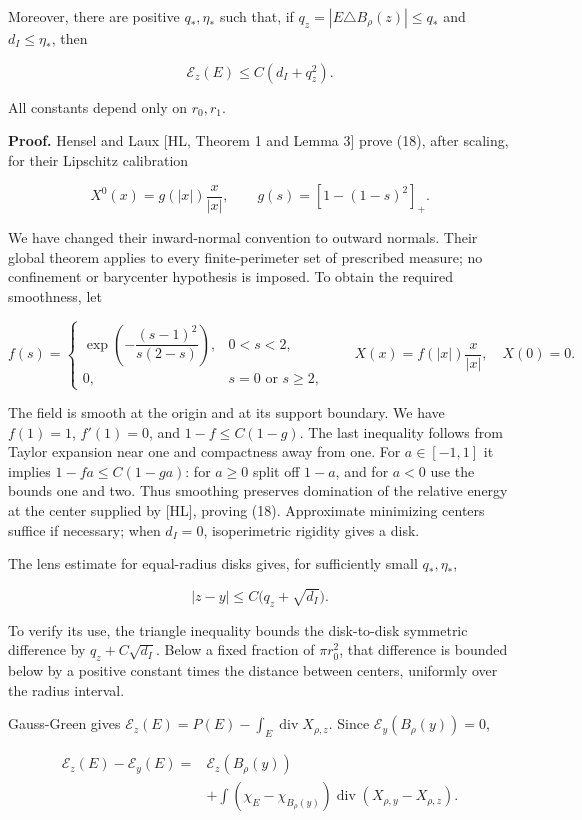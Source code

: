 \documentclass[11pt]{article}
\begin{document}
Moreover, there are positive \(q_*,\eta_*\) such that, if
\(q_z=|E\triangle B_\rho(z)|\le q_*\) and \(d_I\le\eta_*\), then

\[
\mathcal E_z(E)\le C(d_I+q_z^2).
\tag{19}
\]

All constants depend only on \(r_0,r_1\).

\textbf{Proof.} Hensel and Laux {[}HL, Theorem 1 and Lemma 3{]} prove
(18), after scaling, for their Lipschitz calibration

\[
X^0(x)=g(|x|)\frac{x}{|x|},\qquad g(s)=[1-(1-s)^2]_+.
\]

We have changed their inward-normal convention to outward normals. Their
global theorem applies to every finite-perimeter set of prescribed
measure; no confinement or barycenter hypothesis is imposed. To obtain
the required smoothness, let

\[
f(s)=\begin{cases}
\exp\!\left(-\dfrac{(s-1)^2}{s(2-s)}\right),&0<s<2,\\
0,&s=0\text{ or }s\ge2,
\end{cases}
\qquad X(x)=f(|x|)\frac{x}{|x|},\quad X(0)=0.
\tag{20}
\]

The field is smooth at the origin and at its support boundary. We have
\(f(1)=1\), \(f'(1)=0\), and \(1-f\le C(1-g)\). The last inequality
follows from Taylor expansion near one and compactness away from one.
For \(a\in[-1,1]\) it implies \(1-fa\le C(1-ga)\): for \(a\ge0\) split
off \(1-a\), and for \(a<0\) use the bounds one and two. Thus smoothing
preserves domination of the relative energy at the center supplied by
{[}HL{]}, proving (18). Approximate minimizing centers suffice if
necessary; when \(d_I=0\), isoperimetric rigidity gives a disk.

The lens estimate for equal-radius disks gives, for sufficiently small
\(q_*,\eta_*\),

\[
|z-y|\le C\bigl(q_z+\sqrt{d_I}\bigr).
\tag{21}
\]

To verify its use, the triangle inequality bounds the disk-to-disk
symmetric difference by \(q_z+C\sqrt{d_I}\). Below a fixed fraction of
\(\pi r_0^2\), that difference is bounded below by a positive constant
times the distance between centers, uniformly over the radius interval.

Gauss-Green gives
\(\mathcal E_z(E)=P(E)-\int_E\operatorname{div}X_{\rho,z}\). Since
\(\mathcal E_y(B_\rho(y))=0\),

\[
\begin{aligned}
\mathcal E_z(E)-\mathcal E_y(E)
={}&\mathcal E_z(B_\rho(y))\\
&+\int(\chi_E-\chi_{B_\rho(y)})
\operatorname{div}(X_{\rho,y}-X_{\rho,z}).
\end{aligned}
\tag{22}
\]
\end{document}
